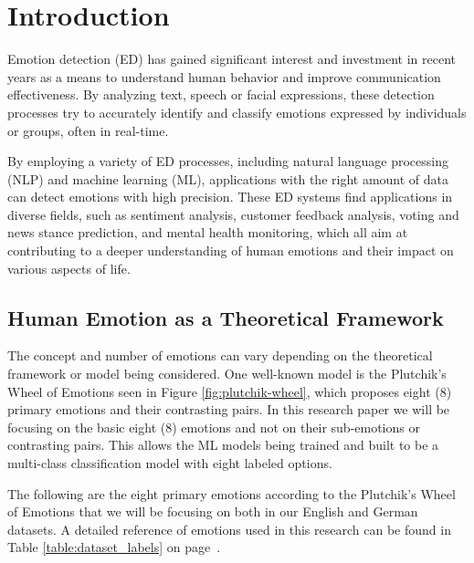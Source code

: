 \documentclass[11pt]{article}
\begin{document}
\tableofcontents

\clearpage
\section{Introduction}

Emotion detection (ED) has gained significant interest and investment\cite{Sarker2021} in recent years as a means to understand human behavior and improve communication effectiveness. By analyzing text, speech or facial expressions, these detection processes try to accurately identify and classify emotions expressed by individuals or groups, often in real-time.

By employing a variety of ED processes, including natural language processing (NLP) and machine learning (ML), applications with the right amount of data can detect emotions with high precision\cite{research-emotion-recognition-for-online-learning}. These ED systems find applications in diverse fields, such as sentiment analysis, customer feedback analysis, voting and news stance prediction, and mental health monitoring, which all aim at contributing to a deeper understanding of human emotions and their impact on various aspects of life.

\subsection{Human Emotion as a Theoretical Framework}
\label{sec:human-emotion-as-a-theoretical-framework}
The concept and number of emotions can vary depending on the theoretical framework or model being considered. One well-known model is the Plutchik's Wheel of Emotions seen in Figure \ref{fig:plutchik-wheel}, which proposes eight (8) primary emotions and their contrasting pairs. In this research paper we will be focusing on the basic eight (8) emotions and not on their sub-emotions or contrasting pairs. This allows the ML models being trained and built to be a multi-class classification model with eight labeled options.

The following are the eight primary emotions according to the Plutchik's Wheel of Emotions \cite{Tromp} that we will be focusing on both in our English and German datasets. A detailed reference of emotions used in this research can be found in Table \ref{table:dataset_labels} on page~\pageref{table:dataset_labels}.
\end{document}
